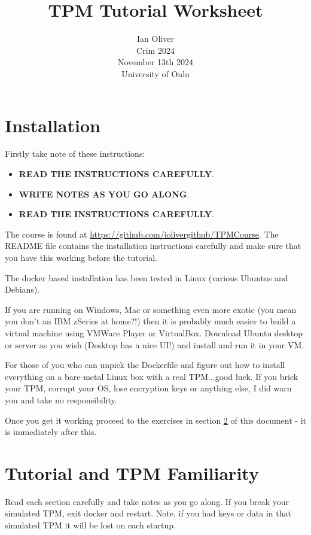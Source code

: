 \documentclass[11pt,a4paper]{article}
\begin{document}
\title{TPM Tutorial Worksheet}
\author{Ian Oliver\\Crim 2024\\November 13th 2024\\University of Oulu}
\date{}

\maketitle

\tableofcontents


\section{Installation}
Firstly take note of these instructions:
\begin{itemize}
 \item \textbf{READ THE INSTRUCTIONS CAREFULLY}.
 \item \textbf{WRITE NOTES AS YOU GO ALONG}.
 \item \textbf{READ THE INSTRUCTIONS CAREFULLY}.
 \end{itemize}

The course is found at \url{https://github.com/iolivergithub/TPMCourse}. The README file contains the installation instructions carefully and make sure that you have this working before the tutorial.

The docker based installation has been tested in Linux (various Ubuntus and Debians).

If you are running on Windows, Mac or something even more exotic (you mean you don't an IBM zSeries at home?!) then it is probably much easier to build a virtual machine using VMWare Player or VirtualBox. Download Ubuntu desktop or server as you wish (Desktop has a nice UI!) and install and run it in your VM.

For those of you who can unpick the Dockerfile and figure out how to install everything on a bare-metal Linux box with a real TPM...good luck. If you brick your TPM, corrupt your OS, lose encryption keys or anything else, I did warn you and take no responsibility.

Once you get it working proceed to the exercises in section \ref{theexercises} of this document - it is immediately after this.



\section{Tutorial and TPM Familiarity}\label{theexercises}
Read each section carefully and take notes as you go along. If you break your simulated TPM, exit docker and restart. Note, if you had keys or data in that simulated TPM it will be lost on each startup.
\end{document}
